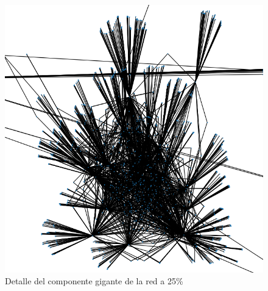 \documentclass{article}
\begin{document}
    \begin{figure}
        \centering
        \includegraphics[width=\textwidth]{net25-detail.png}
        \caption{Detalle del componente gigante de la red a 25\%}
        \label{fig:net25detail}
    \end{figure}
\end{document}
